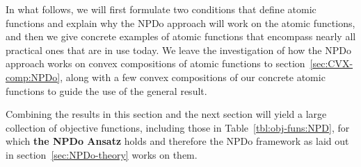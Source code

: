 \documentclass[11pt]{article}
\newcommand\STMnbr{{\rm St}_{\delta}(k,n)}
\DeclareMathOperator{\tr}{tr}
\DeclareMathOperator{\T}{T}
\theoremstyle{definition}
\numberwithin{equation}{section}
\begin{document}
In what follows, we will first formulate two conditions that define
atomic functions  and explain why the NPDo approach will work  on the atomic functions, and then we give concrete examples of
atomic functions that encompass nearly all practical ones that are in use today. We leave
the investigation of how the NPDo approach works on convex compositions of  atomic functions to section~\ref{sec:CVX-comp:NPDo},
along with a few convex compositions of our concrete atomic functions to guide the use of
the general result.

Combining the results in this section and the next section will yield
a large collection of objective functions, including those in Table~\ref{tbl:obj-funs:NPD}, for which
{\bf the NPDo Ansatz} holds and therefore the NPDo framework as laid out in section~\ref{sec:NPDo-theory}
works on them.

\end{document}
